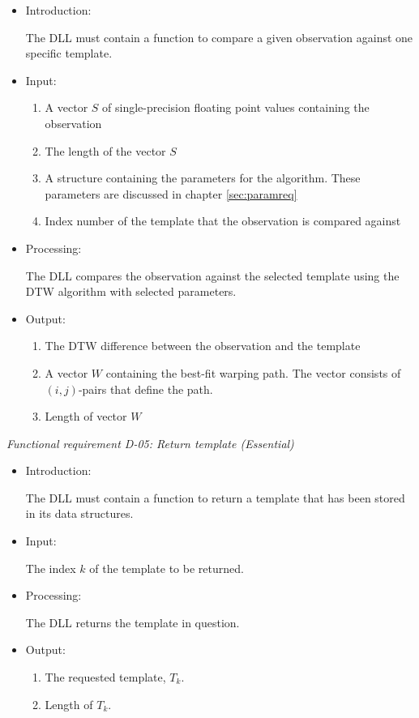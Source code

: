 \documentclass[a4paper,11pt]{article}
\begin{document}
\begin{itemize}
\item Introduction:

The DLL must contain a function to compare a given observation against one specific template.
\item Input:

\begin{enumerate}
\item A vector $S$ of single-precision floating point values containing the observation
\item The length of the vector $S$
\item A structure containing the parameters for the algorithm. These parameters are discussed in chapter \ref{sec:paramreq}
\item Index number of the template that the observation is compared against
\end{enumerate}

\item Processing:

The DLL compares the observation against the selected template using the DTW algorithm with selected parameters.
\item Output:

\begin{enumerate}
\item The DTW difference between the observation and the template
\item A vector $W$ containing the best-fit warping path. The vector consists of $(i,j)$-pairs that define
the path.
\item Length of vector $W$
\end{enumerate}
\end{itemize}


\noindent \emph{Functional requirement D-05: Return template (Essential)}
\begin{itemize}
\item Introduction:

The DLL must contain a function to return a template that has been stored in its data structures.
\item Input:

The index $k$ of the template to be returned.
\item Processing:

The DLL returns the template in question.
\item Output:

\begin{enumerate}
\item The requested template, $T_k$.
\item Length of $T_k$.
\end{enumerate}
\end{itemize}
\end{document}
